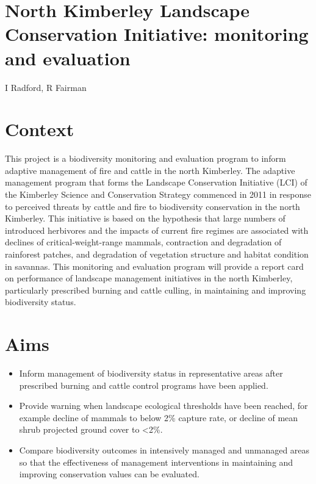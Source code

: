 \documentclass[version=last,
    paper=a4, %
    10pt, %
    usenames,
    dvipsnames,
    oneside, %
    headings=openany, %
    DIV=15 %
]{scrbook}
\begin{document}
\section*{North Kimberley Landscape Conservation Initiative: monitoring and
evaluation
}

I Radford, R Fairman


\section*{Context}
This project is a biodiversity monitoring and evaluation program to
inform adaptive management of fire and cattle in the north Kimberley.
The adaptive management program that forms the Landscape Conservation
Initiative (LCI) of the Kimberley Science and Conservation Strategy
commenced in 2011 in response to perceived threats by cattle and fire to
biodiversity conservation in the north Kimberley. This initiative is
based on the hypothesis that large numbers of introduced herbivores and
the impacts of current fire regimes are associated with declines of
critical-weight-range mammals, contraction and degradation of rainforest
patches, and degradation of vegetation structure and habitat condition
in savannas. This monitoring and evaluation program will provide a
report card on performance of landscape management initiatives in the
north Kimberley, particularly prescribed burning and cattle culling, in
maintaining and improving biodiversity status.



\section*{Aims}
\begin{itemize}
\itemsep1pt\parskip0pt
\item
  Inform management of biodiversity status in representative areas after
  prescribed burning and cattle control programs have been applied.
\item
  Provide warning when landscape ecological thresholds have been
  reached, for example decline of mammals to below 2\% capture rate, or
  decline of mean shrub projected ground cover to \textless{}2\%.
\item
  Compare biodiversity outcomes in intensively managed and unmanaged
  areas so that the effectiveness of management interventions in
  maintaining and improving conservation values can be evaluated.
\end{itemize}
\end{document}
